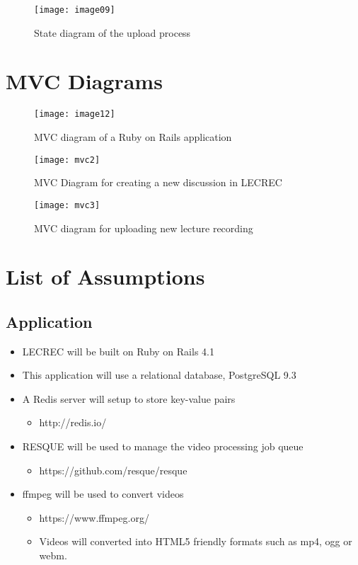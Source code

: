 \documentclass{article}
\begin{document}
\begin{figure}[h!]
\centering
\texttt{[image: image09]}
\caption{State diagram of the upload process}
\end{figure}

\clearpage
\section{MVC Diagrams}
\begin{figure}[h!]
\centering
\texttt{[image: image12]}
\caption{MVC diagram of a Ruby on Rails application}
\end{figure}

\begin{figure}[h!]
\centering
\texttt{[image: mvc2]}
\caption{MVC Diagram for creating a new discussion in LECREC}
\end{figure}

\begin{figure}[h!]
\centering
\texttt{[image: mvc3]}
\caption{MVC diagram for uploading new lecture recording}
\end{figure}

\clearpage
\section{List of Assumptions}
\subsection{Application}
\begin{itemize}
\item LECREC will be built on Ruby on Rails 4.1
\item This application will use a relational database, PostgreSQL 9.3
\item A Redis server will setup to store key-value pairs
\begin{itemize}
\item http://redis.io/
\end{itemize}
\item RESQUE will be used to manage the video processing job queue
\begin{itemize}
\item https://github.com/resque/resque
\end{itemize}
\item ffmpeg will be used to convert videos
\begin{itemize}
\item https://www.ffmpeg.org/
\item Videos will converted into HTML5 friendly formats such as mp4, ogg or webm.
\end{itemize}
\end{itemize}
\end{document}
